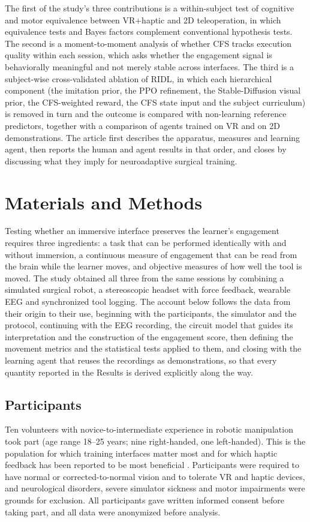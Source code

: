 \documentclass[utf8]{frontiers_suppmat}
\begin{document}
The first of the study's three contributions is a within-subject test of cognitive and motor equivalence between VR+haptic and 2D teleoperation, in which equivalence tests and Bayes factors complement conventional hypothesis tests. The second is a moment-to-moment analysis of whether CFS tracks execution quality within each session, which asks whether the engagement signal is behaviorally meaningful and not merely stable across interfaces. The third is a subject-wise cross-validated ablation of RIDL, in which each hierarchical component (the imitation prior, the PPO refinement, the Stable-Diffusion visual prior, the CFS-weighted reward, the CFS state input and the subject curriculum) is removed in turn and the outcome is compared with non-learning reference predictors, together with a comparison of agents trained on VR and on 2D demonstrations. The article first describes the apparatus, measures and learning agent, then reports the human and agent results in that order, and closes by discussing what they imply for neuroadaptive surgical training.

\section{Materials and Methods}
Testing whether an immersive interface preserves the learner's engagement requires three ingredients: a task that can be performed identically with and without immersion, a continuous measure of engagement that can be read from the brain while the learner moves, and objective measures of how well the tool is moved. The study obtained all three from the same sessions by combining a simulated surgical robot, a stereoscopic headset with force feedback, wearable EEG and synchronized tool logging. The account below follows the data from their origin to their use, beginning with the participants, the simulator and the protocol, continuing with the EEG recording, the circuit model that guides its interpretation and the construction of the engagement score, then defining the movement metrics and the statistical tests applied to them, and closing with the learning agent that reuses the recordings as demonstrations, so that every quantity reported in the Results is derived explicitly along the way.

\subsection{Participants}
Ten volunteers with novice-to-intermediate experience in robotic manipulation took part (age range 18--25 years; nine right-handed, one left-handed). This is the population for which training interfaces matter most and for which haptic feedback has been reported to be most beneficial \cite{hapticshci2,brugada2022}. Participants were required to have normal or corrected-to-normal vision and to tolerate VR and haptic devices, and neurological disorders, severe simulator sickness and motor impairments were grounds for exclusion. All participants gave written informed consent before taking part, and all data were anonymized before analysis.
\end{document}
